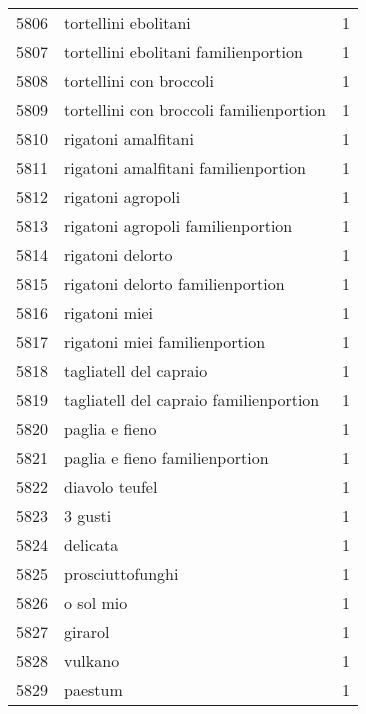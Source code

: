 \begin{tabular}{llr}
5806 &                               tortellini ebolitani &      1 \\
5807 &               tortellini ebolitani familienportion &      1 \\
5808 &                            tortellini con broccoli &      1 \\
5809 &            tortellini con broccoli familienportion &      1 \\
5810 &                                rigatoni amalfitani &      1 \\
5811 &                rigatoni amalfitani familienportion &      1 \\
5812 &                                  rigatoni agropoli &      1 \\
5813 &                  rigatoni agropoli familienportion &      1 \\
5814 &                                   rigatoni delorto &      1 \\
5815 &                   rigatoni delorto familienportion &      1 \\
5816 &                                      rigatoni miei &      1 \\
5817 &                      rigatoni miei familienportion &      1 \\
5818 &                             tagliatell del capraio &      1 \\
5819 &             tagliatell del capraio familienportion &      1 \\
5820 &                                     paglia e fieno &      1 \\
5821 &                     paglia e fieno familienportion &      1 \\
5822 &                                     diavolo teufel &      1 \\
5823 &                                            3 gusti &      1 \\
5824 &                                           delicata &      1 \\
5825 &                                   prosciuttofunghi &      1 \\
5826 &                                          o sol mio &      1 \\
5827 &                                            girarol &      1 \\
5828 &                                            vulkano &      1 \\
5829 &                                            paestum &      1 \\

\end{tabular}
